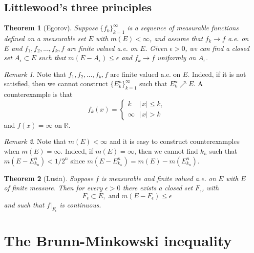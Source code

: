 \documentclass[
]{book}
\newtheorem{theorem}{Theorem}[chapter]
\theoremstyle{definition}
\theoremstyle{definition}
\theoremstyle{definition}
\theoremstyle{definition}
\theoremstyle{remark}
\newtheorem*{remark}{Remark}
\begin{document}
\subsection{Littlewood's three principles}\label{littlewoods-three-principles}

\begin{theorem}[Egorov]
\protect\hypertarget{thm:egorov}{}\label{thm:egorov}Suppose \(\{f_k\}_{k=1}^{\infty}\) is a sequence of measurable functions defined on a measurable set \(E\) with \(m(E)<\infty\), and assume that \(f_k\to f\) a.e. on \(E\) and \(f_1,f_2,\dots,f_k,f\) are finite valued a.e. on \(E\). Given \(\epsilon>0\), we can find a closed set \(A_{\epsilon}\subset E\) such that \(m(E-A_{\epsilon})\le \epsilon\) and \(f_k\to f\) uniformly on \(A_{\epsilon}\).
\end{theorem}

\begin{remark}
Note that \(f_1,f_2,\dots,f_k,f\) are finite valued a.e. on \(E\). Indeed, if it is not satisfied, then we cannot construct \(\{E_k^n\}_{k=1}^\infty\) such that \(E_k^n\nearrow E\). A counterexample is that
\[
f_k(x)=\begin{cases}
k&|x|\le k,\\
\infty &|x|>k
\end{cases}
\]
and \(f(x)=\infty\) on \(\mathbb{R}\).
\end{remark}

\begin{remark}
Note that \(m(E)<\infty\) and it is easy to construct counterexamples when \(m(E)=\infty\). Indeed, if \(m(E)=\infty\), then we cannot find \(k_n\) such that \(m(E-E_{k_n}^n)<1/2^n\) since \(m(E-E_{k_n}^n)=m(E)-m(E_{k_n}^n)\).
\end{remark}

\begin{theorem}[Lusin]
\protect\hypertarget{thm:lusin}{}\label{thm:lusin}Suppose \(f\) is measurable and finite valued a.e. on \(E\) with \(E\) of finite measure. Then for every \(\epsilon>0\) there exists a closed set \(F_{\epsilon}\), with
\[
F_{\epsilon}\subset E, \text{ and }m(E-F_{\epsilon})\le \epsilon
\]
and such that \(f|_{F_{\epsilon}}\) is continuous.
\end{theorem}

\section{The Brunn-Minkowski inequality}\label{the-brunn-minkowski-inequality}
\end{document}

